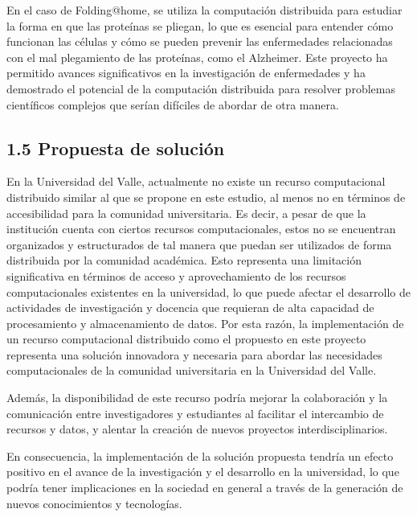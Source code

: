\begin{spacing}{1.5}
  En el caso de Folding@home, se utiliza la computación distribuida para
  estudiar la forma en que las proteínas se pliegan, lo que es esencial para
  entender cómo funcionan las células y cómo se pueden prevenir las enfermedades
  relacionadas con el mal plegamiento de las proteínas, como el Alzheimer. Este
  proyecto ha permitido avances significativos en la investigación de
  enfermedades y ha demostrado el potencial de la computación distribuida para
  resolver problemas científicos complejos que serían difíciles de abordar de
  otra manera. \cite{Folding@home-1}

  \subsection{1.5 Propuesta de solución}

  En la Universidad del Valle, actualmente no existe un recurso computacional distribuido similar al que se propone en este estudio, al menos no en términos de accesibilidad para la comunidad universitaria. Es decir, a pesar de que la institución cuenta con ciertos recursos computacionales, estos no se encuentran organizados y estructurados de tal manera que puedan ser utilizados de forma distribuida por la comunidad académica. Esto representa una limitación significativa en términos de acceso y aprovechamiento de los recursos computacionales existentes en la universidad, lo que puede afectar el desarrollo de actividades de investigación y docencia que requieran de alta capacidad de procesamiento y almacenamiento de datos. Por esta razón, la implementación de un recurso computacional distribuido como el propuesto en este proyecto representa una solución innovadora y necesaria para abordar las necesidades computacionales de la comunidad universitaria en la Universidad del Valle.

  Además, la disponibilidad de este recurso podría mejorar la colaboración y la comunicación entre investigadores y estudiantes al facilitar el intercambio de recursos y datos, y alentar la creación de nuevos proyectos interdisciplinarios. 
  
  En consecuencia, la implementación de la solución propuesta tendría un efecto positivo en el avance de la investigación y el desarrollo en la universidad, lo que podría tener implicaciones en la sociedad en general a través de la generación de nuevos conocimientos y tecnologías.


\end{spacing}
